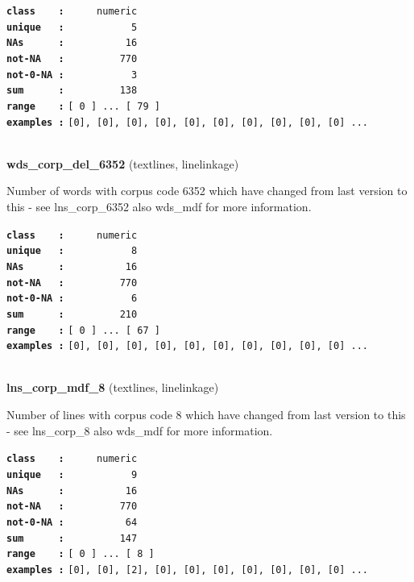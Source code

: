\documentclass[]{article}
\begin{document}
\textbf{\texttt{class\ \ \ \ :}} \texttt{~~~~~numeric}\\
\textbf{\texttt{unique\ \ \ :}} \texttt{~~~~~~~~~~~5}\\
\textbf{\texttt{NAs\ \ \ \ \ \ :}} \texttt{~~~~~~~~~~16}\\
\textbf{\texttt{not-NA\ \ \ :}} \texttt{~~~~~~~~~770}\\
\textbf{\texttt{not-0-NA\ :}} \texttt{~~~~~~~~~~~3}\\
\textbf{\texttt{sum\ \ \ \ \ \ :}} \texttt{~~~~~~~~~138}\\
\textbf{\texttt{range\ \ \ \ :}}
\texttt{{[}\ 0\ {]}\ ...\ {[}\ 79\ {]}}\\
\textbf{\texttt{examples\ :}}
\texttt{{[}0{]},\ {[}0{]},\ {[}0{]},\ {[}0{]},\ {[}0{]},\ {[}0{]},\ {[}0{]},\ {[}0{]},\ {[}0{]},\ {[}0{]}\ ...}\\

~

\textbf{wds\_corp\_del\_6352} (textlines, linelinkage)

Number of words with corpus code 6352 which have changed from last
version to this - see lns\_corp\_6352 also wds\_mdf for more
information.

\textbf{\texttt{class\ \ \ \ :}} \texttt{~~~~~numeric}\\
\textbf{\texttt{unique\ \ \ :}} \texttt{~~~~~~~~~~~8}\\
\textbf{\texttt{NAs\ \ \ \ \ \ :}} \texttt{~~~~~~~~~~16}\\
\textbf{\texttt{not-NA\ \ \ :}} \texttt{~~~~~~~~~770}\\
\textbf{\texttt{not-0-NA\ :}} \texttt{~~~~~~~~~~~6}\\
\textbf{\texttt{sum\ \ \ \ \ \ :}} \texttt{~~~~~~~~~210}\\
\textbf{\texttt{range\ \ \ \ :}}
\texttt{{[}\ 0\ {]}\ ...\ {[}\ 67\ {]}}\\
\textbf{\texttt{examples\ :}}
\texttt{{[}0{]},\ {[}0{]},\ {[}0{]},\ {[}0{]},\ {[}0{]},\ {[}0{]},\ {[}0{]},\ {[}0{]},\ {[}0{]},\ {[}0{]}\ ...}\\

~

\textbf{lns\_corp\_mdf\_8} (textlines, linelinkage)

Number of lines with corpus code 8 which have changed from last version
to this - see lns\_corp\_8 also wds\_mdf for more information.

\textbf{\texttt{class\ \ \ \ :}} \texttt{~~~~~numeric}\\
\textbf{\texttt{unique\ \ \ :}} \texttt{~~~~~~~~~~~9}\\
\textbf{\texttt{NAs\ \ \ \ \ \ :}} \texttt{~~~~~~~~~~16}\\
\textbf{\texttt{not-NA\ \ \ :}} \texttt{~~~~~~~~~770}\\
\textbf{\texttt{not-0-NA\ :}} \texttt{~~~~~~~~~~64}\\
\textbf{\texttt{sum\ \ \ \ \ \ :}} \texttt{~~~~~~~~~147}\\
\textbf{\texttt{range\ \ \ \ :}}
\texttt{{[}\ 0\ {]}\ ...\ {[}\ 8\ {]}}\\
\textbf{\texttt{examples\ :}}
\texttt{{[}0{]},\ {[}0{]},\ {[}2{]},\ {[}0{]},\ {[}0{]},\ {[}0{]},\ {[}0{]},\ {[}0{]},\ {[}0{]},\ {[}0{]}\ ...}\\
\end{document}
